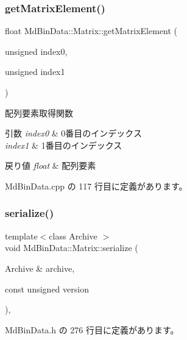 \subsubsection{\texorpdfstring{get\+Matrix\+Element()}{getMatrixElement()}}
{\footnotesize\ttfamily float Md\+Bin\+Data\+::\+Matrix\+::get\+Matrix\+Element (\begin{DoxyParamCaption}\item[{unsigned}]{index0,  }\item[{unsigned}]{index1 }\end{DoxyParamCaption})}



配列要素取得関数 


\begin{DoxyParams}{引数}
{\em index0} & 0番目のインデックス \\
\hline
{\em index1} & 1番目のインデックス \\
\hline
\end{DoxyParams}

\begin{DoxyRetVals}{戻り値}
{\em float} & 配列要素 \\
\hline
\end{DoxyRetVals}


 Md\+Bin\+Data.\+cpp の 117 行目に定義があります。

\mbox{\label{class_md_bin_data_1_1_matrix_a8494155c326062f5a4c7e2352b7c577d}} 
\subsubsection{\texorpdfstring{serialize()}{serialize()}}
{\footnotesize\ttfamily template$<$class Archive $>$ \\
void Md\+Bin\+Data\+::\+Matrix\+::serialize (\begin{DoxyParamCaption}\item[{Archive \&}]{archive,  }\item[{const unsigned}]{version }\end{DoxyParamCaption})\hspace{0.3cm}{\ttfamily [inline]}, {\ttfamily [private]}}



 Md\+Bin\+Data.\+h の 276 行目に定義があります。

